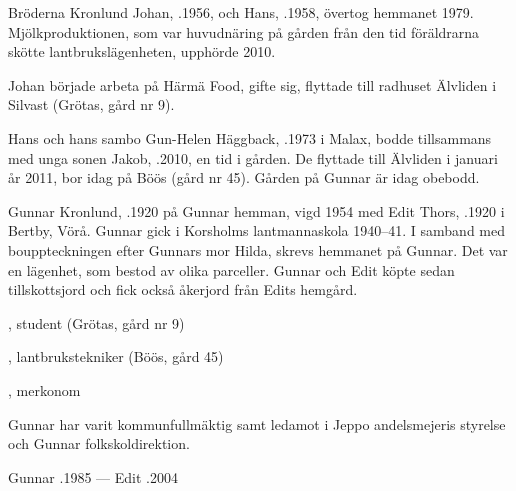 
%
Bröderna Kronlund Johan, .1956, och Hans, .1958, övertog hemmanet 1979. Mjölkproduktionen, som var huvudnäring på gården från den tid föräldrarna skötte lantbrukslägenheten, upphörde 2010.

Johan började arbeta på Härmä Food, gifte sig, flyttade till radhuset Älvliden i Silvast (Grötas, gård nr 9).

Hans och hans sambo Gun-Helen Häggback, .1973 i Malax, bodde tillsammans med unga sonen Jakob, .2010, en tid i gården. De flyttade till Älvliden i januari år 2011, bor idag på Böös (gård nr 45). Gården på Gunnar är idag obebodd.


%
Gunnar Kronlund, .1920 på Gunnar hemman, vigd 1954 med Edit Thors, .1920 i Bertby, Vörå. Gunnar gick i Korsholms lantmannaskola 1940--41. I samband med bouppteckningen efter Gunnars mor Hilda, skrevs hemmanet på Gunnar. Det var en lägenhet, som bestod av olika parceller. Gunnar och Edit köpte sedan tillskottsjord och fick också åkerjord från Edits hemgård.
\begin{jhchildren}
  \item {}, student (Grötas, gård nr 9)
  \item {}, lantbrukstekniker (Böös, gård 45)
  \item {}, merkonom
\end{jhchildren}

Gunnar har varit kommunfullmäktig samt ledamot i Jeppo andelsmejeris styrelse och Gunnar folkskoldirektion.

Gunnar .1985  ---  Edit .2004



%



